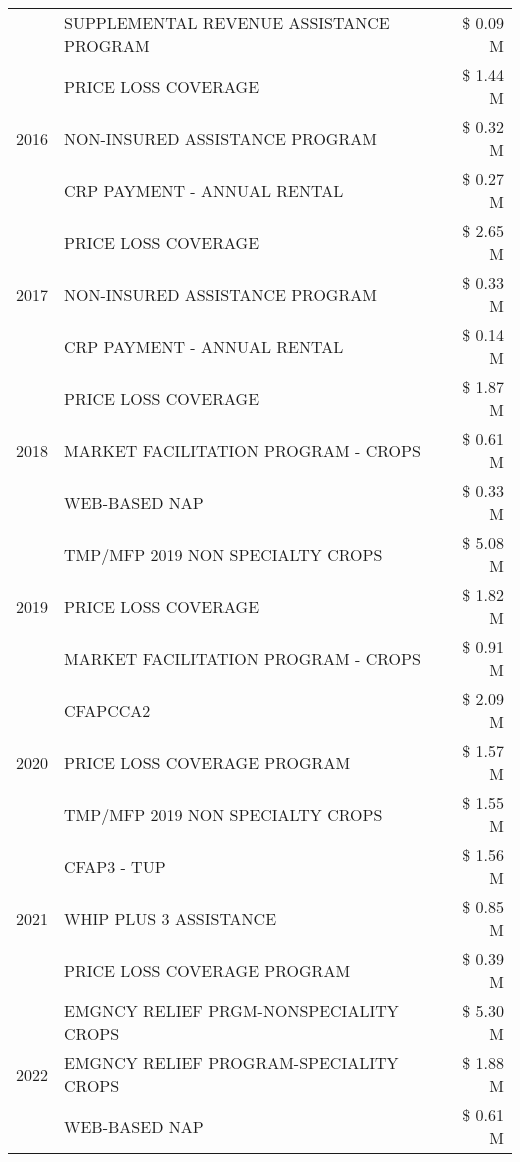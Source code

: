 \begin{tabular}{llr}
 & SUPPLEMENTAL REVENUE ASSISTANCE PROGRAM & \$ 0.09 M \\
\cline{1-3}
\multirow[t]{3}{*}{2016} & PRICE LOSS COVERAGE & \$ 1.44 M \\
 & NON-INSURED ASSISTANCE PROGRAM & \$ 0.32 M \\
 & CRP PAYMENT - ANNUAL RENTAL & \$ 0.27 M \\
\cline{1-3}
\multirow[t]{3}{*}{2017} & PRICE LOSS COVERAGE & \$ 2.65 M \\
 & NON-INSURED ASSISTANCE PROGRAM & \$ 0.33 M \\
 & CRP PAYMENT - ANNUAL RENTAL & \$ 0.14 M \\
\cline{1-3}
\multirow[t]{3}{*}{2018} & PRICE LOSS COVERAGE & \$ 1.87 M \\
 & MARKET FACILITATION PROGRAM - CROPS & \$ 0.61 M \\
 & WEB-BASED NAP & \$ 0.33 M \\
\cline{1-3}
\multirow[t]{3}{*}{2019} & TMP/MFP 2019 NON SPECIALTY CROPS & \$ 5.08 M \\
 & PRICE LOSS COVERAGE & \$ 1.82 M \\
 & MARKET FACILITATION PROGRAM - CROPS & \$ 0.91 M \\
\cline{1-3}
\multirow[t]{3}{*}{2020} & CFAPCCA2 & \$ 2.09 M \\
 & PRICE LOSS COVERAGE PROGRAM & \$ 1.57 M \\
 & TMP/MFP 2019 NON SPECIALTY CROPS & \$ 1.55 M \\
\cline{1-3}
\multirow[t]{3}{*}{2021} & CFAP3 - TUP & \$ 1.56 M \\
 & WHIP PLUS 3 ASSISTANCE & \$ 0.85 M \\
 & PRICE LOSS COVERAGE PROGRAM & \$ 0.39 M \\
\cline{1-3}
\multirow[t]{3}{*}{2022} & EMGNCY RELIEF PRGM-NONSPECIALITY CROPS & \$ 5.30 M \\
 & EMGNCY RELIEF PROGRAM-SPECIALITY CROPS & \$ 1.88 M \\
 & WEB-BASED NAP & \$ 0.61 M \\
\cline{1-3}
\bottomrule
\end{tabular}
